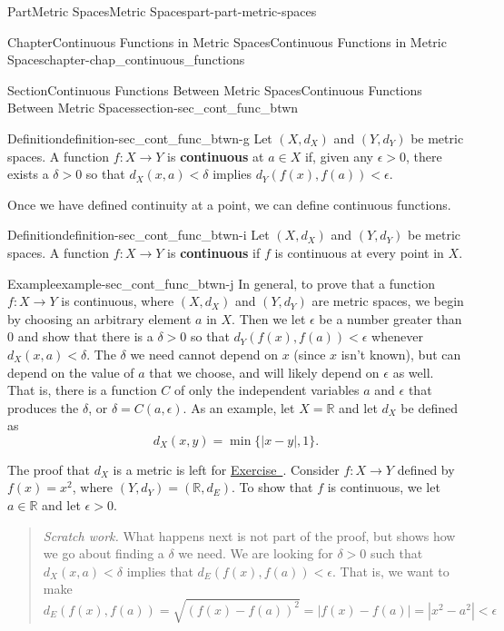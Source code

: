 \documentclass[oneside,10pt,]{book}
\newcommand{\xreffont}{\relax}
\newcommand{\terminology}[1]{\textbf{#1}}
\numberwithin{equation}{chapter}
\newcommand{\R}{\mathbb{R}}
\newcommand{\lt}{<}
\newcommand{\gt}{>}
\begin{document}
\begin{partptx}{Part}{Metric Spaces}{}{Metric Spaces}{}{}{part-part-metric-spaces}
\begin{chapterptx}{Chapter}{Continuous Functions in Metric Spaces}{}{Continuous Functions in Metric Spaces}{}{}{chapter-chap_continuous_functions}
\begin{sectionptx}{Section}{Continuous Functions Between Metric Spaces}{}{Continuous Functions Between Metric Spaces}{}{}{section-sec_cont_func_btwn}
\begin{definition}{Definition}{}{definition-sec_cont_func_btwn-g}
%
Let \((X,d_X)\) and \((Y, d_Y)\) be metric spaces. A function \(f:X \to Y\) is \terminology{continuous} at \(a \in X\) if, given any \(\epsilon \gt 0\), there exists a \(\delta \gt 0\) so that \(d_X(x,a)\lt \delta\) implies \(d_Y(f(x), f(a)) \lt \epsilon\).%
\end{definition}
Once we have defined continuity at a point, we can define continuous functions.%
\begin{definition}{Definition}{}{definition-sec_cont_func_btwn-i}%
%
Let \((X,d_X)\) and \((Y, d_Y)\) be metric spaces. A function \(f:X \to Y\) is \terminology{continuous} if \(f\) is continuous at every point in \(X\).%
\end{definition}
\begin{example}{Example}{}{example-sec_cont_func_btwn-j}%
In general, to prove that a function \(f:X \to Y\) is continuous, where \((X,d_X)\) and \((Y, d_Y)\) are metric spaces, we begin by choosing an arbitrary element \(a\) in \(X\). Then we let \(\epsilon\) be a number greater than \(0\) and show that there is a \(\delta \gt 0\) so that \(d_Y(f(x),f(a)) \lt  \epsilon\) whenever \(d_X(x,a) \lt  \delta\). The \(\delta\) we need cannot depend on \(x\) (since \(x\) isn't known), but can depend on the value of \(a\) that we choose, and will likely depend on \(\epsilon\) as well. That is, there is a function \(C\) of only the independent variables \(a\) and \(\epsilon\) that produces the \(\delta\), or \(\delta = C(a,\epsilon)\). As an example, let \(X = \R\) and let \(d_X\) be defined as%
\begin{equation*}
d_X(x,y) = \min\{|x-y|,1\}\text{.}
\end{equation*}
%
\par
The proof that \(d_X\) is a metric is left for \hyperlink{exercise-ex_min_1_metric}{Exercise~{\xreffont 9}}. Consider \(f : X \to Y\) defined by \(f(x) = x^2\), where \((Y,d_Y) = (\R, d_E)\). To show that \(f\) is continuous, we let \(a \in \R\) and let \(\epsilon \gt 0\).%
\begin{quote}%
\emph{Scratch work.} What happens next is not part of the proof, but shows how we go about finding a \(\delta\) we need. We are looking for \(\delta \gt 0\) such that \(d_X(x,a) \lt  \delta\) implies that \(d_E(f(x),f(a)) \lt  \epsilon\). That is, we want to make%
\begin{equation*}
d_E(f(x),f(a)) = \sqrt{(f(x)-f(a))^2} = |f(x)-f(a)| = |x^2-a^2| \lt  \epsilon
\end{equation*}

\end{quote}
\end{example}
\end{sectionptx}
\end{chapterptx}
\end{partptx}
\end{document}
